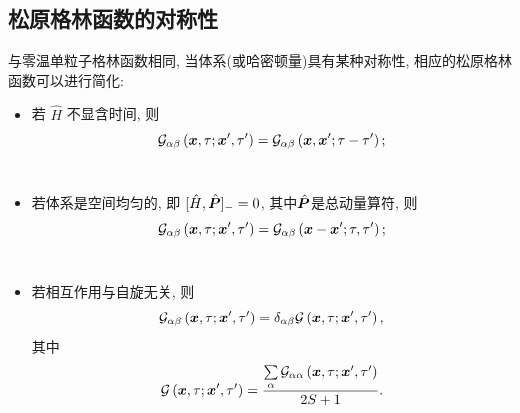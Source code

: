 \subsection{松原格林函数的对称性}
与零温单粒子格林函数相同, 当体系(或哈密顿量)具有某种对称性, 相应的松原格林函数可以进行简化:
\begin{itemize}
\item 若 $\hat{H}$ 不显含时间, 则 
\begin{equation}
\mathcal{G}_{\alpha \beta}\left(\boldsymbol{x}, \tau ; \boldsymbol{x}^{\prime}, \tau^{\prime}\right)=\mathcal{G}_{\alpha \beta}\left(\boldsymbol{x}, \boldsymbol{x}^{\prime} ; \tau-\tau^{\prime}\right);
\end{equation}\\
\item 若体系是空间均匀的, 即 $[\hat{H}, \hat{\boldsymbol{P}}]_{-}=0$, 其中$\hat{\boldsymbol{P}}$是总动量算符, 则
\begin{equation}
\mathcal{G}_{\alpha \beta}\left(\boldsymbol{x}, \tau ; \boldsymbol{x}^{\prime}, \tau^{\prime}\right)=\mathcal{G}_{\alpha \beta}\left(\boldsymbol{x}-\boldsymbol{x}^{\prime} ; \tau, \tau^{\prime}\right);
\end{equation}\\
\item 若相互作用与自旋无关, 则 
\begin{equation}
\mathcal{G}_{\alpha \beta}\left(\boldsymbol{x}, \tau ; \boldsymbol{x}^{\prime}, \tau^{\prime}\right)=\delta_{\alpha \beta} \mathcal{G}\left(\boldsymbol{x}, \tau ; \boldsymbol{x}^{\prime}, \tau^{\prime}\right),
\end{equation}
其中 
\begin{equation}
\mathcal{G}\left(\boldsymbol{x}, \tau ; \boldsymbol{x}^{\prime}, \tau^{\prime}\right)=\frac{\sum\limits_{ \alpha} \mathcal{G}_{\alpha \alpha}\left(\boldsymbol{x}, \tau ; \boldsymbol{x}^{\prime}, \tau^{\prime}\right)}{2 S+1}.
\end{equation} 
\end{itemize}
